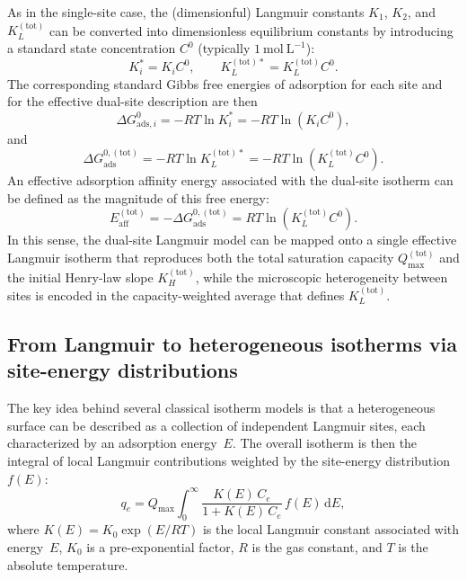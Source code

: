 	As in the single-site case, the (dimensionful) Langmuir constants
	\(K_1\), \(K_2\), and \(K_L^{\mathrm{(tot)}}\) can be converted into
	dimensionless equilibrium constants by introducing a standard state
	concentration \(C^0\) (typically \(1~\mathrm{mol~L^{-1}}\)):
	\begin{equation}
		K_i^{\ast} = K_i C^0,
		\qquad
		K_L^{\mathrm{(tot)}\ast} = K_L^{\mathrm{(tot)}} C^0.
	\end{equation}
	The corresponding standard Gibbs free energies of adsorption for
	each site and for the effective dual-site description are then
	\begin{equation}
		\Delta G_{\mathrm{ads},i}^{0}
		= - R T \ln K_i^{\ast}
		= - R T \ln\left( K_i C^0 \right),
	\end{equation}
	and
	\begin{equation}
		\Delta G_{\mathrm{ads}}^{0,\mathrm{(tot)}}
		= - R T \ln K_L^{\mathrm{(tot)}\ast}
		= - R T \ln\left( K_L^{\mathrm{(tot)}} C^0 \right).
	\end{equation}
	An effective adsorption affinity energy associated with the dual-site
	isotherm can be defined as the magnitude of this free energy:
	\begin{equation}
		E_{\mathrm{aff}}^{\mathrm{(tot)}}
		= - \Delta G_{\mathrm{ads}}^{0,\mathrm{(tot)}}
		= R T \ln\left( K_L^{\mathrm{(tot)}} C^0 \right).
	\end{equation}
	In this sense, the dual-site Langmuir model can be mapped onto a
	single effective Langmuir isotherm that reproduces both the total
	saturation capacity \(Q_{\max}^{\mathrm{(tot)}}\) and the initial
	Henry-law slope \(K_H^{\mathrm{(tot)}}\), while the microscopic
	heterogeneity between sites is encoded in the capacity-weighted
	average that defines \(K_L^{\mathrm{(tot)}}\).
	
	\subsection{From Langmuir to heterogeneous isotherms via site-energy distributions}

	The key idea behind several classical isotherm models is that a
	heterogeneous surface can be described as a collection of independent
	Langmuir sites, each characterized by an adsorption energy~$E$.
	The overall isotherm is then the integral of local Langmuir
	contributions weighted by the site-energy distribution~$f(E)$:
	\begin{equation}
		q_e = Q_{\max} \int_{0}^{\infty}
		\frac{K(E)\, C_e}{1 + K(E)\, C_e}\, f(E)\, \mathrm{d}E,
		\label{eq:general_heterogeneous}
	\end{equation}
	where $K(E) = K_0 \exp(E / RT)$ is the local Langmuir constant
	associated with energy~$E$, $K_0$ is a pre-exponential factor,
	$R$ is the gas constant, and $T$ is the absolute temperature.

